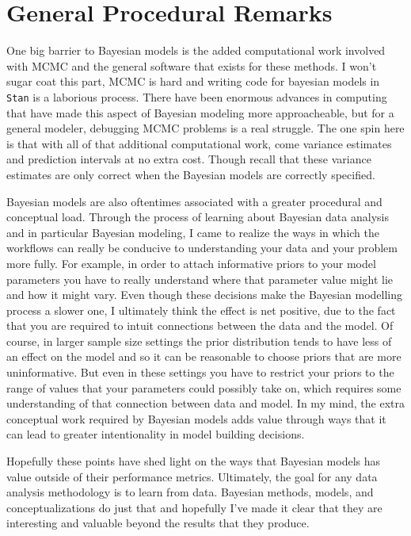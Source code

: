 \documentclass[12pt,twoside]{reedthesis}
\begin{document}
\hypertarget{general-procedural-remarks}{%
\section{General Procedural Remarks}\label{general-procedural-remarks}}

One big barrier to Bayesian models is the added computational work involved with MCMC and the general software that exists for these methods. I won't sugar coat this part, MCMC is hard and writing code for bayesian models in \texttt{Stan} is a laborious process. There have been enormous advances in computing that have made this aspect of Bayesian modeling more approacheable, but for a general modeler, debugging MCMC problems is a real struggle. The one spin here is that with all of that additional computational work, come variance estimates and prediction intervals at no extra cost. Though recall that these variance estimates are only correct when the Bayesian models are correctly specified.

Bayesian models are also oftentimes associated with a greater procedural and conceptual load. Through the process of learning about Bayesian data analysis and in particular Bayesian modeling, I came to realize the ways in which the workflows can really be conducive to understanding your data and your problem more fully. For example, in order to attach informative priors to your model parameters you have to really understand where that parameter value might lie and how it might vary. Even though these decisions make the Bayesian modelling process a slower one, I ultimately think the effect is net positive, due to the fact that you are required to intuit connections between the data and the model. Of course, in larger sample size settings the prior distribution tends to have less of an effect on the model and so it can be reasonable to choose priors that are more uninformative. But even in these settings you have to restrict your priors to the range of values that your parameters could possibly take on, which requires some understanding of that connection between data and model. In my mind, the extra conceptual work required by Bayesian models adds value through ways that it can lead to greater intentionality in model building decisions.

Hopefully these points have shed light on the ways that Bayesian models has value outside of their performance metrics. Ultimately, the goal for any data analysis methodology is to learn from data. Bayesian methods, models, and conceptualizations do just that and hopefully I've made it clear that they are interesting and valuable beyond the results that they produce.
\end{document}
